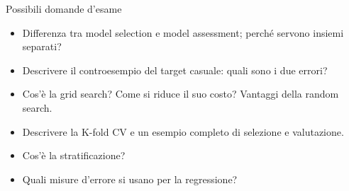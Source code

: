 \begin{boxquestion}{Possibili domande d'esame}

\begin{itemize}
\tightlist
\item
  Differenza tra model selection e model assessment; perché servono
  insiemi separati?
\item
  Descrivere il controesempio del target casuale: quali sono i due
  errori?
\item
  Cos'è la grid search? Come si riduce il suo costo? Vantaggi della
  random search.
\item
  Descrivere la K-fold CV e un esempio completo di selezione e
  valutazione.
\item
  Cos'è la stratificazione?
\item
  Quali misure d'errore si usano per la regressione?
\end{itemize}

\end{boxquestion}
